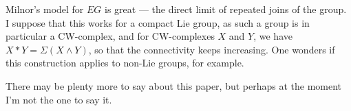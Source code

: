 \documentclass[11pt]{article}
\begin{document}
\begin{AtiyahSegalEqKthy}
Milnor's model for $EG$ is great --- the direct limit of repeated joins of the group. I suppose that this works for a compact Lie group, as such a group is in particular a CW-complex, and for CW-complexes $X$ and $Y$, we have $X*Y=\Sigma(X\wedge Y)$, so that the connectivity keeps increasing. One wonders if this construction applies to non-Lie groups, for example.

There may be plenty more to say about this paper, but perhaps at the moment I'm not the one to say it.

\textbf{}

\noindent [Question: Does a vector bundle on $X$ induce the structure of $\pi_1X$-module on its fibre? I thought about a possible construction but didn't have time to decide whether it was well defined. If there were a connection here, there might correspondingly be something to say about the morphism $R(G)\to K(BG)$, at least when $G$ is discrete, so that $\pi_1(BG)=G$.]

\pagebreak
\end{AtiyahSegalEqKthy}
\end{document}
